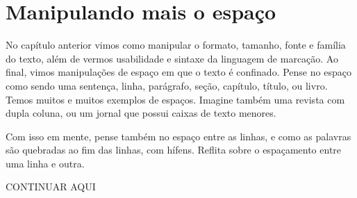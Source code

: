 \chapter{Manipulando mais o espaço}
No capítulo anterior vimos como manipular o formato, tamanho, fonte e família do texto,
além de vermos usabilidade e sintaxe da linguagem de marcação.
Ao final, vimos manipulações de espaço em que o texto é confinado.
Pense no espaço como sendo uma sentença, linha, parágrafo, seção,
capítulo, título, ou livro.
Temos muitos e muitos exemplos de espaços.
Imagine também uma revista com dupla coluna,
ou um jornal que possui caixas de texto menores.

Com isso em mente, pense também no espaço entre as linhas,
e como as palavras são quebradas ao fim das linhas, com hífens.
Reflita sobre o espaçamento entre uma linha e outra.

CONTINUAR AQUI
